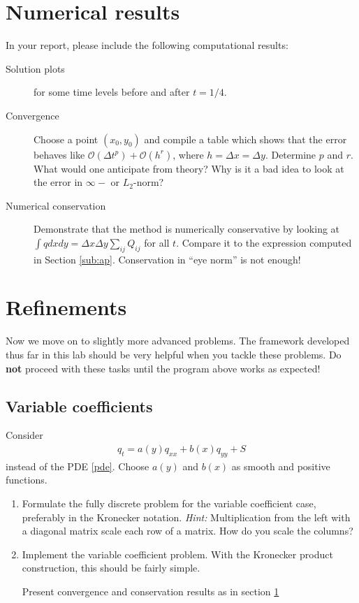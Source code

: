 \documentclass[11pt, a4paper]{article}
\newcommand{\dx}{\Delta x}
\newcommand{\dy}{\Delta y}
\begin{document}
\section{Numerical results} \label{sec:numres}
In your report, please include the following computational results:
\begin{description}
\item[Solution plots] for some time levels before and after $t=1/4$.
\item[Convergence] Choose a point $(x_0,y_0)$ and compile a table which
  shows that the error behaves like $\mathcal{O}(\Delta t^p) +
  \mathcal{O}(h^r)$, where $h = \dx = \dy$. Determine $p$ and
  $r$. What would one anticipate from theory? Why is it a bad idea to
  look at the error in $\infty-$ or $L_2$-norm?
\item[Numerical conservation] Demonstrate that the method is
  numerically conservative by looking at $\int q dx dy =
  \dx\dy\sum_{ij} Q_{ij}$ for all $t$. Compare it to the expression
  computed in Section \ref{sub:ap}. Conservation in ``eye norm'' is
  not enough!
\end{description}
\section{Refinements}
Now we move on to slightly more advanced problems. The framework
developed thus far in this lab should be very helpful when you tackle
these problems. Do {\bf not} proceed with these tasks until the
program above works as expected!
\subsection{Variable coefficients} \label{sec:varcoeff}
Consider
\begin{align}
  q_t = a(y) q_{xx} + b(x) q_{yy} + S
\end{align}
instead of the PDE \eqref{pde}. Choose $a(y)$ and $b(x)$ as smooth and
positive functions.
\begin{enumerate}
\item Formulate the fully discrete problem for the variable
  coefficient case, preferably in the Kronecker notation. \emph{Hint:}
  Multiplication from the left with a diagonal matrix scale each row
  of a matrix. How do you scale the columns?
\item Implement the variable coefficient problem. With the Kronecker
  product construction, this should be fairly simple.

  Present convergence and conservation results as in section \ref{sec:numres}
\end{enumerate}
\end{document}
